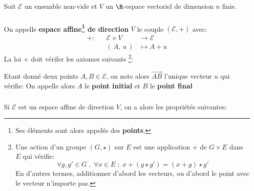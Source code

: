 \chapter*{} %
Soit \(\mathscr{E}\) un ensemble non-vide et \(V\) un \(\R\)-espace vectoriel de dimension \(n\) finie.
\subsection*{}
On appelle \textbf{espace affine\footnote[1]{Ses éléments sont alors appelés des \textbf{points}.} de direction} \(V\) le couple \((\mathscr{E}, +)\) avec:
\[
   \begin{aligned}
      + : &&\mathscr{E} \times V &\longrightarrow \mathscr{E}\\
      &&(\,A, \, u\,) &\longmapsto A + u
   \end{aligned}
\]
La loi + doit vérifer les axiomes suivants 
\footnote[2]{Une action d'un groupe \((G, \star)\) sur \(E\) est une application \(+\) de \(G \times E \) dans \(E\) qui vérifie: \[
   \forall g, g' \in G  \; , \; \forall x \in E \; ; \; x + (g \star g') = (x + g) \star g'
\] \hspace{15pt} En d'autres termes, additionner d'abord les vecteurs, ou d'abord le point avec le vecteur n'importe pas.}:

Etant donné deux points \(A, B \in \mathscr{E}\), on note alors \(\overrightarrow{AB}\) l'unique vecteur \(u\) qui vérifie:
On appelle alors \(A\) le \textbf{point initial} et \(B\) le \textbf{point final}

\subsection*{}
Si \(\mathscr{E}\) est un espace affine de direction \(V\), on a alors les propriétés suivantes:

